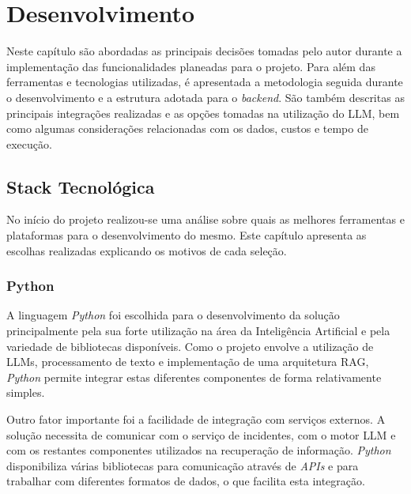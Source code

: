 
\chapter{Desenvolvimento} %
\label{chap:Chapter6} %

	Neste capítulo são abordadas as principais decisões tomadas pelo autor durante a implementação das funcionalidades planeadas para o projeto. Para além das ferramentas e tecnologias utilizadas, é apresentada a metodologia seguida durante o desenvolvimento e a estrutura adotada para o \textit{backend}. São também descritas as principais integrações realizadas e as opções tomadas na utilização do \gls{LLM}, bem como algumas considerações relacionadas com os dados, custos e tempo de execução.

\section{Stack Tecnológica}

	No início do projeto realizou-se uma análise sobre quais as melhores ferramentas e plataformas para o desenvolvimento do mesmo. Este capítulo apresenta as escolhas realizadas explicando os motivos de cada seleção.
	
	\subsection{Python}
		A linguagem \textit{Python} foi escolhida para o desenvolvimento da solução principalmente pela sua forte utilização na área da Inteligência Artificial e pela variedade de bibliotecas disponíveis. Como o projeto envolve a utilização de \gls{LLM}s, processamento de texto e implementação de uma arquitetura \gls{RAG}, \textit{Python} permite integrar estas diferentes componentes de forma relativamente simples.
		
		Outro fator importante foi a facilidade de integração com serviços externos. A solução necessita de comunicar com o serviço de incidentes, com o motor \gls{LLM} e com os restantes componentes utilizados na recuperação de informação. \textit{Python} disponibiliza várias bibliotecas para comunicação através de \textit{APIs} e para trabalhar com diferentes formatos de dados, o que facilita esta integração.
		
